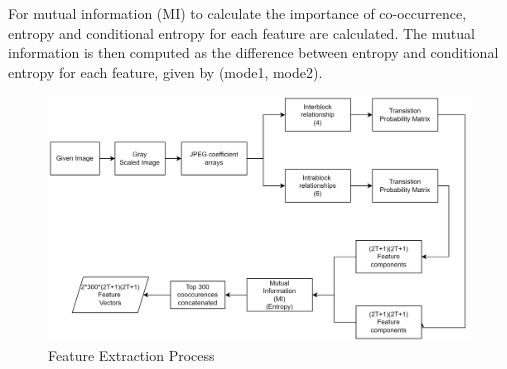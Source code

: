 For mutual information (MI) to calculate the importance of co-occurrence, entropy and conditional entropy for each feature are calculated. The mutual information is then computed as the difference between entropy and conditional entropy for each feature, given by (mode1, mode2).\
\begin{figure}[H]
    \centering
    \includegraphics[width=150mm]{./img/feature_extraction.png}
    \caption{Feature Extraction Process}
\end{figure}

